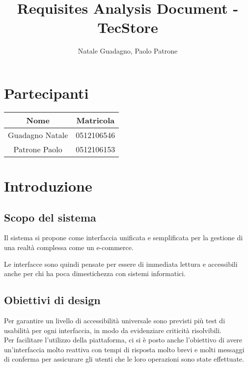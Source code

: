 \documentclass[12pt,a4paper]{article}
\author{Natale Guadagno, Paolo Patrone}
\title{Requisites Analysis Document - TecStore}
\begin{document}
\maketitle
\newpage
\tableofcontents
\newpage
{}
\section*{Partecipanti}
\begin{center}
\begin{tabular} {|c|c|}
\hline
\textbf{Nome} & \textbf{Matricola} \\
\hline
Guadagno Natale & 0512106546 \\
Patrone Paolo & 0512106153 \\
\hline
\end{tabular}
\end{center}
\newpage

\section{Introduzione}
\subsection{Scopo del sistema}
Il sistema si propone come interfaccia unificata e semplificata per la gestione di una realtà complessa come un e-commerce.

Le interfacce sono quindi pensate per essere di immediata lettura e accessibili anche per chi ha poca dimestichezza con sistemi informatici.

\subsection{Obiettivi di design}
Per garantire un livello di accessibilità universale sono previsti più test di usabilità per ogni interfaccia, in modo da evidenziare criticità risolvibili. \\
Per facilitare l'utilizzo della piattaforma, ci si è posto anche l'obiettivo di avere un'interfaccia molto reattiva con tempi di risposta molto brevi e molti messaggi di conferma per assicurare gli utenti che le loro operazioni sono state effettuate.
\end{document}
